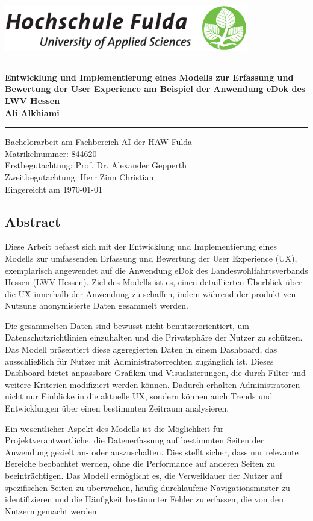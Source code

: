 \documentclass[12pt,oneside]{article}
\newcommand{\HSFTitle}[8]{

  \thispagestyle{empty}
\begin{center}
    \includegraphics[width=0.8\textwidth]{logo.eps} \\
    \vspace*{\stretch{1}}
\end{center}

  {\parindent0cm
  \rule{\linewidth}{.7ex}}
  \begin{center}
    \vspace*{\stretch{1}}
    \sffamily\bfseries\Huge
    #1\\
    \vspace*{\stretch{1}}
    \sffamily\bfseries\large
    #3
    \vspace*{\stretch{1}}
  \end{center}
  \rule{\linewidth}{.7ex}

  \vspace*{\stretch{2}}
  \begin{center}
    \Large #2 am #5 der HAW Fulda \\
    \vspace*{\stretch{1}} 
    \large Matrikelnummer:  #4 \\[1mm]
    \large Erstbegutachtung:  #7 \\[1mm]
    \large Zweitbegutachtung:  #8 \\[1mm]
    \vspace*{\stretch{1}}
    \large Eingereicht am #6
  \end{center}
}
\begin{document}
 
 

 \HSFTitle
      {Entwicklung und Implementierung eines Modells zur Erfassung und Bewertung der User Experience am Beispiel der Anwendung eDok des LWV Hessen }        %
      {Bachelorarbeit} %
      {Ali Alkhiami}          %
      {844620}
      {Fachbereich AI}  %
      {\today}        %
      {Prof. Dr. Alexander Gepperth}     %
      {Herr Zinn Christian}    %

  \clearpage

\lhead{}
    \setcounter{page}{1}
 
\subsection{Abstract}

Diese Arbeit befasst sich mit der Entwicklung und Implementierung eines Modells zur umfassenden Erfassung und Bewertung der User Experience (UX), exemplarisch angewendet auf die Anwendung eDok des Landeswohlfahrtsverbands Hessen (LWV Hessen). Ziel des Modells ist es, einen detaillierten Überblick über die UX innerhalb der Anwendung zu schaffen, indem während der produktiven Nutzung anonymisierte Daten gesammelt werden.

Die gesammelten Daten sind bewusst nicht benutzerorientiert, um Datenschutzrichtlinien einzuhalten und die Privatsphäre der Nutzer zu schützen. Das Modell präsentiert diese aggregierten Daten in einem Dashboard, das ausschließlich für Nutzer mit Administratorrechten zugänglich ist. Dieses Dashboard bietet anpassbare Grafiken und Visualisierungen, die durch Filter und weitere Kriterien modifiziert werden können. Dadurch erhalten Administratoren nicht nur Einblicke in die aktuelle UX, sondern können auch Trends und Entwicklungen über einen bestimmten Zeitraum analysieren.

Ein wesentlicher Aspekt des Modells ist die Möglichkeit für Projektverantwortliche, die Datenerfassung auf bestimmten Seiten der Anwendung gezielt an- oder auszuschalten. Dies stellt sicher, dass nur relevante Bereiche beobachtet werden, ohne die Performance auf anderen Seiten zu beeinträchtigen. Das Modell ermöglicht es, die Verweildauer der Nutzer auf spezifischen Seiten zu überwachen, häufig durchlaufene Navigationsmuster zu identifizieren und die Häufigkeit bestimmter Fehler zu erfassen, die von den Nutzern gemacht werden.
\end{document}
